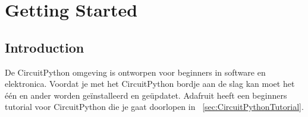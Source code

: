 \chapter{Getting Started}

\section{Introduction}
	De CircuitPython omgeving is ontworpen voor beginners in software en elektronica. Voordat je met het CircuitPython bordje aan de slag kan moet het \'e\'en en ander worden ge\"installeerd en ge\"updatet. Adafruit heeft een beginners tutorial voor CircuitPython die je gaat doorlopen in ~\ref{sec:CircuitPythonTutorial}.%

	
	
	
	
	
	
